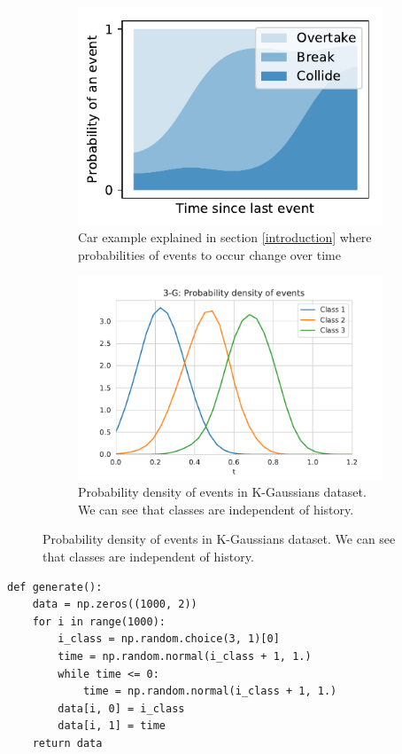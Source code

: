 \begin{figure}[H]
\centering
    \begin{subfigure}{.45\textwidth}
        \centering
    	\includegraphics[width=.8\linewidth]{images/categorical_evolution.pdf}
        \caption{Car example explained in section \ref{introduction} where probabilities of events to occur change over time}
    \label{fig:car_categorical}
    \end{subfigure}%
    \hspace*{10.mm}
    \begin{subfigure}{.45\textwidth}
        \centering
   		\includegraphics[width=.8 \linewidth]{images/k-gaussians-density.pdf}
		\caption{Probability density of events in K-Gaussians dataset. We can see that classes are independent of history.}\label{fig:k-gaussians-density}
    \end{subfigure}
\end{figure}

\begin{minipage}{\linewidth}
\begin{verbatim}
def generate():
    data = np.zeros((1000, 2))
    for i in range(1000):
        i_class = np.random.choice(3, 1)[0]
        time = np.random.normal(i_class + 1, 1.)
        while time <= 0:
            time = np.random.normal(i_class + 1, 1.)
        data[i, 0] = i_class
        data[i, 1] = time
    return data
\end{verbatim}
\end{minipage}


